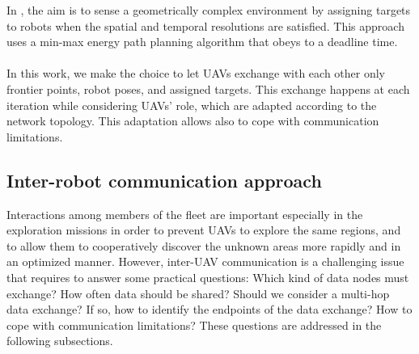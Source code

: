 \documentclass[11pt,openany]{book}
\begin{document}
In \cite{dai2018quality}, the aim is to sense a geometrically complex environment by assigning targets to robots when the spatial and temporal resolutions are satisﬁed. This approach uses a min-max energy path planning algorithm that obeys to a deadline time.\\\\
In this work, we make the choice to let UAVs exchange with each other only frontier points, robot poses, and assigned targets. This exchange happens at each iteration while considering UAVs’ role, which are adapted according to the network topology. This adaptation allows also to cope with communication limitations.
\subsection{Inter-robot communication approach}
Interactions among members of the ﬂeet are important especially in the exploration missions in order to prevent UAVs to explore the same regions, and to allow them to cooperatively discover the unknown areas more rapidly and in an optimized manner. However, inter-UAV communication is a challenging issue that requires to answer some practical questions: Which kind of data nodes must exchange? How often data should be shared? Should we consider a multi-hop data exchange? If so, how to identify the endpoints of the data exchange? How to cope with communication limitations? These questions are addressed in the following subsections.
\end{document}
